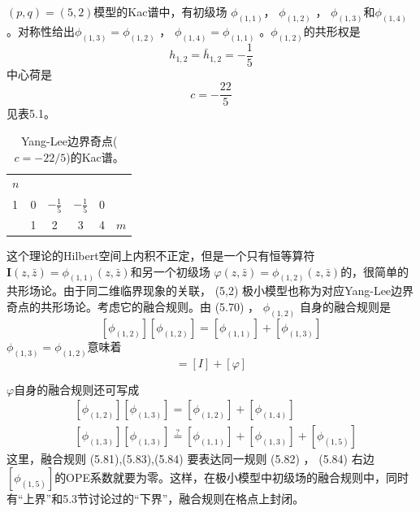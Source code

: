 $(p,q)=(5,2) $模型的Kac谱中，有初级场 $\phi_{(1,1)} $， $\phi_{(1,2)}$ ， $\phi_{(1,3)} 和 \phi_{(1,4)}$ 。对称性给出$ \phi_{(1,3)}=\phi_{(1,2)}$ ， $\phi_{(1,4)}=\phi_{(1,1)}$ 。$ \phi_{(1,2)} $的共形权是
$$
h_{1,2}=\bar{h}_{1,2}=-\frac{1}{5}
$$
中心荷是
$$
c=-\frac{22}{5}
$$
见表5.1。
\begin{table}[h]
	\centering
	\begin{tabular}{l|ccccc}
		$n$ &   &                &                &   &     \\
		1   & 0 & $-\frac{1}{5}$ & $-\frac{1}{5}$ & 0 &     \\ \hline
		& 1 & 2              & 3              & 4 & $m$
	\end{tabular}
	\caption{Yang-Lee边界奇点($c=-22/5$)的Kac谱。}
\end{table}

这个理论的Hilbert空间上内积不正定，但是一个只有恒等算符 $\boldsymbol{I}(z, \bar{z})=\phi_{(1,1)}(z, \bar{z}) $和另一个初级场 $\varphi(z, \bar{z})=\phi_{(1,2)}(z, \bar{z}) $的，很简单的共形场论。由于同二维临界现象的关联， (5,2) 极小模型也称为对应Yang-Lee边界奇点的共形场论。考虑它的融合规则。由 (5.70) ， $\phi_{(1,2)}$ 自身的融合规则是
\begin{equation}
	\left[\phi_{(1,2)}\right]\left[\phi_{(1,2)}\right]=\left[\phi_{(1,1)}\right]+\left[\phi_{(1,3)}\right]
\end{equation}
$\phi_{(1,3)}=\phi_{(1,2)} $意味着
\begin{equation}
	[\varphi][\varphi]=[I]+[\varphi]
\end{equation}

$\varphi $自身的融合规则还可写成
\begin{align} &\left[\phi_{(1,2)}\right]\left[\phi_{(1,3)}\right]=\left[\phi_{(1,2)}\right]+\left[\phi_{(1,4)}\right]\\ &\left[\phi_{(1,3)}\right]\left[\phi_{(1,3)}\right] \stackrel{?}{=}\left[\phi_{(1,1)}\right]+\left[\phi_{(1,3)}\right]+\left[\phi_{(1,5)}\right] \end{align}
这里，融合规则 (5.81),(5.83),(5.84) 要表达同一规则 (5.82) ， (5.84) 右边 $\left[\phi_{(1,5)}\right] $的OPE系数就要为零。这样，在极小模型中初级场的融合规则中，同时有“上界”和5.3节讨论过的“下界”，融合规则在格点上封闭。


